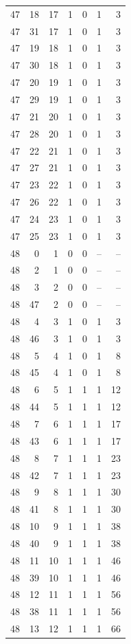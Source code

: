 \begin{longtable}{rrrrrrr}
47 & 18 & 17 & 1 & 0 & 1 & 3\\
47 & 31 & 17 & 1 & 0 & 1 & 3\\
47 & 19 & 18 & 1 & 0 & 1 & 3\\
47 & 30 & 18 & 1 & 0 & 1 & 3\\
47 & 20 & 19 & 1 & 0 & 1 & 3\\
47 & 29 & 19 & 1 & 0 & 1 & 3\\
47 & 21 & 20 & 1 & 0 & 1 & 3\\
47 & 28 & 20 & 1 & 0 & 1 & 3\\
47 & 22 & 21 & 1 & 0 & 1 & 3\\
47 & 27 & 21 & 1 & 0 & 1 & 3\\
47 & 23 & 22 & 1 & 0 & 1 & 3\\
47 & 26 & 22 & 1 & 0 & 1 & 3\\
47 & 24 & 23 & 1 & 0 & 1 & 3\\
47 & 25 & 23 & 1 & 0 & 1 & 3\\
48 & 0 & 1 & 0 & 0 & -- & --\\
48 & 2 & 1 & 0 & 0 & -- & --\\
48 & 3 & 2 & 0 & 0 & -- & --\\
48 & 47 & 2 & 0 & 0 & -- & --\\
48 & 4 & 3 & 1 & 0 & 1 & 3\\
48 & 46 & 3 & 1 & 0 & 1 & 3\\
48 & 5 & 4 & 1 & 0 & 1 & 8\\
48 & 45 & 4 & 1 & 0 & 1 & 8\\
48 & 6 & 5 & 1 & 1 & 1 & 12\\
48 & 44 & 5 & 1 & 1 & 1 & 12\\
48 & 7 & 6 & 1 & 1 & 1 & 17\\
48 & 43 & 6 & 1 & 1 & 1 & 17\\
48 & 8 & 7 & 1 & 1 & 1 & 23\\
48 & 42 & 7 & 1 & 1 & 1 & 23\\
48 & 9 & 8 & 1 & 1 & 1 & 30\\
48 & 41 & 8 & 1 & 1 & 1 & 30\\
48 & 10 & 9 & 1 & 1 & 1 & 38\\
48 & 40 & 9 & 1 & 1 & 1 & 38\\
48 & 11 & 10 & 1 & 1 & 1 & 46\\
48 & 39 & 10 & 1 & 1 & 1 & 46\\
48 & 12 & 11 & 1 & 1 & 1 & 56\\
48 & 38 & 11 & 1 & 1 & 1 & 56\\
48 & 13 & 12 & 1 & 1 & 1 & 66\\

\end{longtable}
